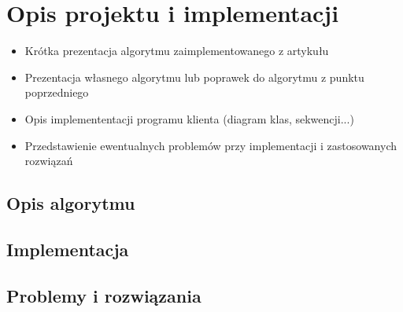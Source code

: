 \chapter{Opis projektu i implementacji}
\label{cha:rozdzial5}

\begin{itemize}
\item Krótka prezentacja algorytmu zaimplementowanego z artykułu 
\item Prezentacja własnego algorytmu lub poprawek do algorytmu z punktu poprzedniego
\item Opis implemententacji programu klienta (diagram klas, sekwencji...)
\item Przedstawienie ewentualnych problemów przy implementacji i zastosowanych rozwiązań
\end{itemize}

\section{Opis algorytmu}

\section{Implementacja}

\section{Problemy i rozwiązania}